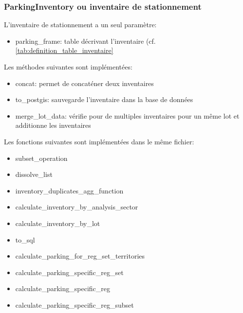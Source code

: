         \subsubsection{ParkingInventory ou inventaire de stationnement}
        L'inventaire de stationnement a un seul paramètre: 
        \begin{itemize}
            \item parking\_frame: table décrivant l'inventaire (cf. \ref{tab:definition_table_inventaire}
        \end{itemize}
        Les méthodes suivantes sont implémentées:
        \begin{itemize}
            \item concat: permet de concaténer deux inventaires
            \item to\_postgis: sauvegarde l'inventaire dans la base de données
            \item merge\_lot\_data: vérifie pour de multiples inventaires pour un même lot et additionne les inventaires
        \end{itemize}
        Les fonctions suivantes sont implémentées dans le même fichier: 
        \begin{itemize}
            \item subset\_operation
            \item dissolve\_list
            \item inventory\_duplicates\_agg\_function
            \item calculate\_inventory\_by\_analysis\_sector
            \item calculate\_inventory\_by\_lot
            \item to\_sql
            \item calculate\_parking\_for\_reg\_set\_territories
            \item calculate\_parking\_specific\_reg\_set
            \item calculate\_parking\_specific\_reg
            \item calculate\_parking\_specific\_reg\_subset
        \end{itemize}
